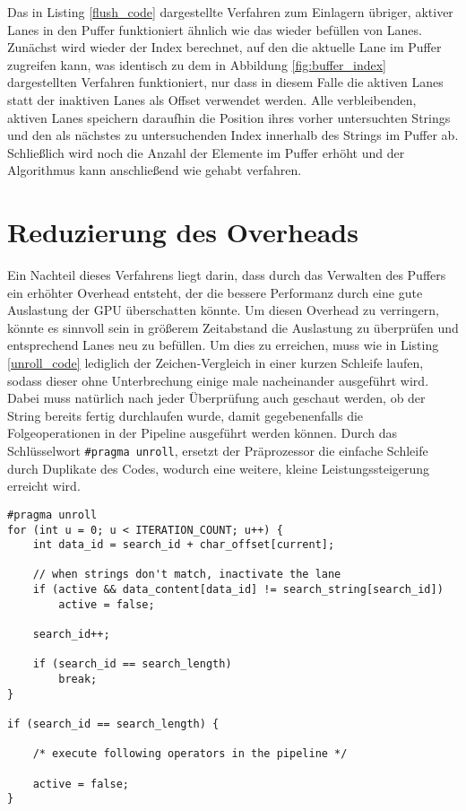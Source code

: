 Das in Listing \ref{flush_code} dargestellte Verfahren zum Einlagern übriger, aktiver Lanes in den Puffer funktioniert ähnlich wie das wieder befüllen von Lanes.
Zunächst wird wieder der Index berechnet, auf den die aktuelle Lane im Puffer zugreifen kann, was identisch zu dem in Abbildung \ref{fig:buffer_index} dargestellten Verfahren funktioniert, nur dass in diesem Falle die aktiven Lanes statt der inaktiven Lanes als Offset verwendet werden.
Alle verbleibenden, aktiven Lanes speichern daraufhin die Position ihres vorher untersuchten Strings und den als nächstes zu untersuchenden Index innerhalb des Strings im Puffer ab.
Schließlich wird noch die Anzahl der Elemente im Puffer erhöht und der Algorithmus kann anschließend wie gehabt verfahren.

\section{Reduzierung des Overheads}
\label{sec:unroll}

Ein Nachteil dieses Verfahrens liegt darin, dass durch das Verwalten des Puffers ein erhöhter Overhead entsteht, der die bessere Performanz durch eine gute Auslastung der GPU überschatten könnte.
Um diesen Overhead zu verringern, könnte es sinnvoll sein in größerem Zeitabstand die Auslastung zu überprüfen und entsprechend Lanes neu zu befüllen.
Um dies zu erreichen, muss wie in Listing \ref{unroll_code} lediglich der Zeichen-Vergleich in einer kurzen Schleife laufen, sodass dieser ohne Unterbrechung einige male nacheinander ausgeführt wird.
Dabei muss natürlich nach jeder Überprüfung auch geschaut werden, ob der String bereits fertig durchlaufen wurde, damit gegebenenfalls die Folgeoperationen in der Pipeline ausgeführt werden können.
Durch das Schlüsselwort \texttt{\#pragma unroll}, ersetzt der Präprozessor die einfache Schleife durch Duplikate des Codes, wodurch eine weitere, kleine Leistungssteigerung erreicht wird.

\begin{lstlisting}[language=MyC++,
caption={Reduzierung des Overheads des Verfahrens},
label=unroll_code]
#pragma unroll
for (int u = 0; u < ITERATION_COUNT; u++) {
	int data_id = search_id + char_offset[current];
	
	// when strings don't match, inactivate the lane
	if (active && data_content[data_id] != search_string[search_id])
		active = false;
	
	search_id++;
	
	if (search_id == search_length)
		break;
}
	
if (search_id == search_length) {

	/* execute following operators in the pipeline */
	
	active = false;
}
\end{lstlisting}
